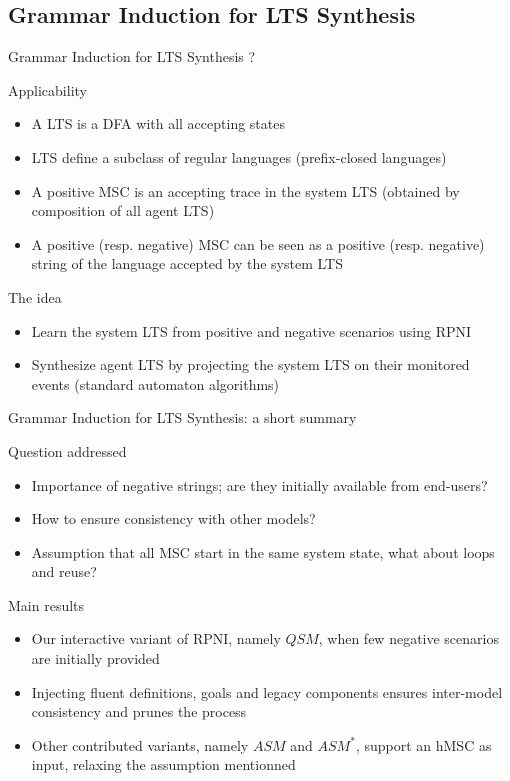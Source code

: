 \documentclass[11pt]{beamer}
\begin{document}
\subsection{Grammar Induction for LTS Synthesis}
\begin{frame}{Grammar Induction for LTS Synthesis ?}
	\begin{block}{Applicability}
		\begin{itemize}
			\item A LTS is a DFA with all accepting states
			\item LTS define a subclass of regular languages (prefix-closed languages)
			\item A positive MSC is an accepting trace in the system LTS (obtained by composition of all agent LTS)
			\item A positive (resp. negative) MSC can be seen as a positive (resp. negative) string of the language accepted by the system LTS
		\end{itemize}
	\end{block}
	\begin{block}{The idea}
		\begin{itemize}
			\item Learn the system LTS from positive and negative scenarios using RPNI
			\item Synthesize agent LTS by projecting the system LTS on their monitored events (standard automaton algorithms)
		\end{itemize}
	\end{block}
\end{frame}

\begin{frame}{Grammar Induction for LTS Synthesis: a short summary}
	\begin{block}{Question addressed}
		\begin{itemize}
			\item Importance of negative strings; are they initially available from end-users?
			\item How to ensure consistency with other models?
			\item Assumption that all MSC start in the same system state, what about loops and reuse?
		\end{itemize}
	\end{block}
	\begin{block}{Main results}
		\begin{itemize}
			\item Our interactive variant of RPNI, namely $QSM$, when few negative scenarios are initially provided
			\item Injecting fluent definitions, goals and legacy components ensures inter-model consistency and prunes the process
			\item Other contributed variants, namely $ASM$ and $ASM^*$, support an hMSC as input, relaxing the assumption mentionned
		\end{itemize}
	\end{block}
\end{frame}
\end{document}
